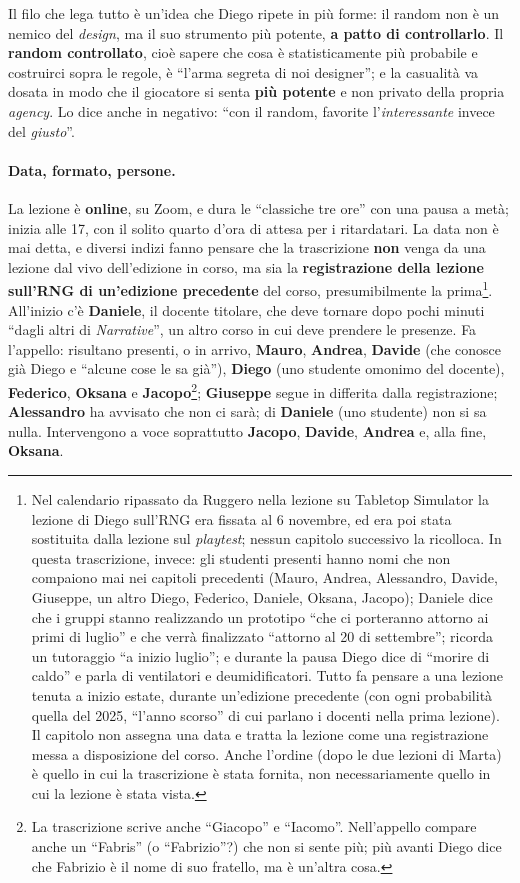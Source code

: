 Il filo che lega tutto è un'idea che Diego ripete in più forme: il random non è un nemico
del \emph{design}, ma il suo strumento più potente, \textbf{a patto di controllarlo}. Il
\textbf{random controllato}, cioè sapere che cosa è statisticamente più probabile e
costruirci sopra le regole, è ``l'arma segreta di noi designer''; e la casualità va dosata
in modo che il giocatore si senta \textbf{più potente} e non privato della propria
\emph{agency}. Lo dice anche in negativo: ``con il random, favorite l'\emph{interessante}
invece del \emph{giusto}''.

\paragraph{Data, formato, persone.} La lezione è \textbf{online}, su Zoom, e dura le
``classiche tre ore'' con una pausa a metà; inizia alle 17, con il solito quarto d'ora di
attesa per i ritardatari. La data non è mai detta, e diversi indizi fanno pensare che la
trascrizione \textbf{non} venga da una lezione dal vivo dell'edizione in corso, ma sia la
\textbf{registrazione della lezione sull'RNG di un'edizione precedente} del corso,
presumibilmente la prima\footnote{Nel calendario ripassato da Ruggero nella lezione su
Tabletop Simulator la lezione di Diego sull'RNG era fissata al 6 novembre, ed era poi stata
sostituita dalla lezione sul \emph{playtest}; nessun capitolo successivo la ricolloca. In
questa trascrizione, invece: gli studenti presenti hanno nomi che non compaiono mai nei
capitoli precedenti (Mauro, Andrea, Alessandro, Davide, Giuseppe, un altro Diego, Federico,
Daniele, Oksana, Jacopo); Daniele dice che i gruppi stanno realizzando un prototipo ``che ci
porteranno attorno ai primi di luglio'' e che verrà finalizzato ``attorno al 20 di
settembre''; ricorda un tutoraggio ``a inizio luglio''; e durante la pausa Diego dice di
``morire di caldo'' e parla di ventilatori e deumidificatori. Tutto fa pensare a una lezione
tenuta a inizio estate, durante un'edizione precedente (con ogni probabilità quella del
2025, ``l'anno scorso'' di cui parlano i docenti nella prima lezione). Il capitolo non
assegna una data e tratta la lezione come una registrazione messa a disposizione del corso.
Anche l'ordine (dopo le due lezioni di Marta) è quello in cui la trascrizione è stata
fornita, non necessariamente quello in cui la lezione è stata vista.}.
All'inizio c'è \textbf{Daniele}, il docente titolare, che deve tornare dopo pochi minuti
``dagli altri di \emph{Narrative}'', un altro corso in cui deve prendere le presenze. Fa
l'appello: risultano presenti, o in arrivo, \textbf{Mauro}, \textbf{Andrea},
\textbf{Davide} (che conosce già Diego e ``alcune cose le sa già''), \textbf{Diego} (uno
studente omonimo del docente), \textbf{Federico}, \textbf{Oksana} e
\textbf{Jacopo}\footnote{La trascrizione scrive anche ``Giacopo'' e ``Iacomo''. Nell'appello
compare anche un ``Fabris'' (o ``Fabrizio''?) che non si sente più; più avanti Diego dice che
Fabrizio è il nome di suo fratello, ma è un'altra cosa.}; \textbf{Giuseppe} segue in
differita dalla registrazione; \textbf{Alessandro} ha avvisato che non ci sarà;
di \textbf{Daniele} (uno studente) non si sa nulla. Intervengono a voce soprattutto
\textbf{Jacopo}, \textbf{Davide}, \textbf{Andrea} e, alla fine, \textbf{Oksana}.

